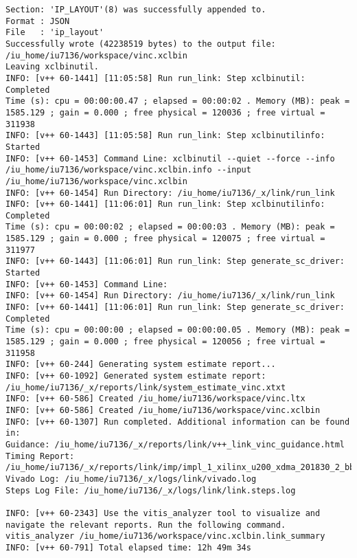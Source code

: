 \begin{lstlisting}[label=lst:code_2,caption=Содержимое файла  v++*.log]
Section: 'IP_LAYOUT'(8) was successfully appended to.
Format : JSON
File   : 'ip_layout'
Successfully wrote (42238519 bytes) to the output file: /iu_home/iu7136/workspace/vinc.xclbin
Leaving xclbinutil.
INFO: [v++ 60-1441] [11:05:58] Run run_link: Step xclbinutil: Completed
Time (s): cpu = 00:00:00.47 ; elapsed = 00:00:02 . Memory (MB): peak = 1585.129 ; gain = 0.000 ; free physical = 120036 ; free virtual = 311938
INFO: [v++ 60-1443] [11:05:58] Run run_link: Step xclbinutilinfo: Started
INFO: [v++ 60-1453] Command Line: xclbinutil --quiet --force --info /iu_home/iu7136/workspace/vinc.xclbin.info --input /iu_home/iu7136/workspace/vinc.xclbin
INFO: [v++ 60-1454] Run Directory: /iu_home/iu7136/_x/link/run_link
INFO: [v++ 60-1441] [11:06:01] Run run_link: Step xclbinutilinfo: Completed
Time (s): cpu = 00:00:02 ; elapsed = 00:00:03 . Memory (MB): peak = 1585.129 ; gain = 0.000 ; free physical = 120075 ; free virtual = 311977
INFO: [v++ 60-1443] [11:06:01] Run run_link: Step generate_sc_driver: Started
INFO: [v++ 60-1453] Command Line: 
INFO: [v++ 60-1454] Run Directory: /iu_home/iu7136/_x/link/run_link
INFO: [v++ 60-1441] [11:06:01] Run run_link: Step generate_sc_driver: Completed
Time (s): cpu = 00:00:00 ; elapsed = 00:00:00.05 . Memory (MB): peak = 1585.129 ; gain = 0.000 ; free physical = 120056 ; free virtual = 311958
INFO: [v++ 60-244] Generating system estimate report...
INFO: [v++ 60-1092] Generated system estimate report: /iu_home/iu7136/_x/reports/link/system_estimate_vinc.xtxt
INFO: [v++ 60-586] Created /iu_home/iu7136/workspace/vinc.ltx
INFO: [v++ 60-586] Created /iu_home/iu7136/workspace/vinc.xclbin
INFO: [v++ 60-1307] Run completed. Additional information can be found in:
Guidance: /iu_home/iu7136/_x/reports/link/v++_link_vinc_guidance.html
Timing Report: /iu_home/iu7136/_x/reports/link/imp/impl_1_xilinx_u200_xdma_201830_2_bb_locked_timing_summary_routed.rpt
Vivado Log: /iu_home/iu7136/_x/logs/link/vivado.log
Steps Log File: /iu_home/iu7136/_x/logs/link/link.steps.log

INFO: [v++ 60-2343] Use the vitis_analyzer tool to visualize and navigate the relevant reports. Run the following command. 
vitis_analyzer /iu_home/iu7136/workspace/vinc.xclbin.link_summary 
INFO: [v++ 60-791] Total elapsed time: 12h 49m 34s
\end{lstlisting}